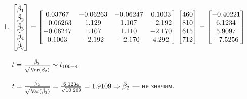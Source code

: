 \begin{solution}
\begin{enumerate}
\item $\begin{bmatrix}
\hat{\beta}_1 \\
\hat{\beta}_2 \\
\hat{\beta}_3 \\
\hat{\beta}_4 \\
\hat{\beta}_5 \\
\end{bmatrix} = \begin{bmatrix}
0.03767 & -0.06263 & -0.06247 & 0.1003 \\
-0.06263 & 1.129 & 1.107 & -2.192 \\
-0.06247 & 1.107 & 1.110 & -2.170 \\
0.1003 & -2.192 & -2.170 & 4.292 \\
\end{bmatrix} \begin{bmatrix}
460\\
810\\
615\\
712\\
\end{bmatrix} = \begin{bmatrix}
-0.40221 \\
6.1234 \\
5.9097 \\
-7.5256 \\
\end{bmatrix}$

$t = \frac{\hat{\beta}_2}{\sqrt{\operatorname{Var}(\hat{\beta}_2)}} \sim t_{100-4}$

$t = \frac{\hat{\beta}_2}{\sqrt{\operatorname{Var}(\hat{\beta}_2)}} = \frac{6.1234}{\sqrt{10.269}} = 1.9109 \Rightarrow \hat{\beta}_2$ --- не значим.
\end{enumerate}
\end{solution}


